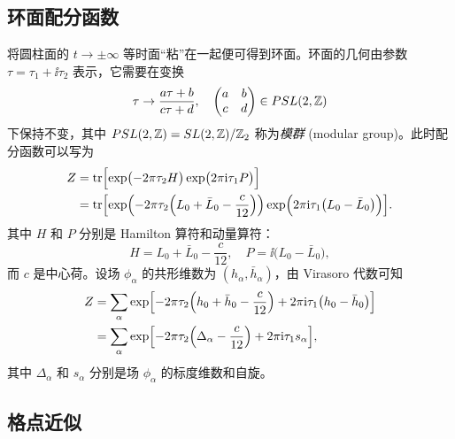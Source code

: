 \subsection{环面配分函数}

将圆柱面的 $t\to\pm\infty$ 等时面“粘”在一起便可得到环面。环面的几何由参数 $\tau=\tau_1+\ii\tau_2$ 表示，它需要在变换
\begin{equation}
  \tau \to \frac{a\tau+b}{c\tau+d}, \quad \begin{pmatrix} a & b \\ c & d \end{pmatrix} \in PSL(2,\mathbb{Z})
\end{equation}
下保持不变，其中 $PSL(2,\mathbb{Z})=SL(2,\mathbb{Z})/\mathbb{Z}_2$ 称为\emph{模群} (modular group)。此时配分函数可以写为\cite{cardy1986operator,francesco2012conformal}
\begin{align}
  Z &= \operatorname{tr} \Bigl[ \exp \bigl( -2\pi\tau_2 H \bigr) \exp \bigl( 2\pi\mathrm{i}\tau_1 P \bigr) \Bigr] \notag \\
    &= \operatorname{tr} \Bigl[
         \exp \Bigl( -2\pi   \tau_2 \Bigl( L_0 + \bar{L}_0 - \frac{c}{12} \Bigr) \Bigr)
         \exp \Bigl(  2\pi\mathrm{i}\tau_1 \bigl( L_0 - \bar{L}_0 \bigr) \Bigr)
       \Bigr].
\end{align}
其中 $H$ 和 $P$ 分别是 Hamilton 算符和动量算符：
\begin{equation}
  H = L_0 + \bar{L}_0 - \frac{c}{12}, \quad P = \ii \bigl( L_0 - \bar{L}_0 \bigr),
\end{equation}
而 $c$ 是中心荷。设场 $\phi_\alpha$ 的共形维数为 $(h_\alpha,\bar{h}_\alpha)$，由 Virasoro 代数可知
\begin{align}
  Z &= \sum_\alpha \exp \Bigl[
         - 2\pi   \tau_2 \Bigl( h_0 + \bar{h}_0 - \frac{c}{12} \Bigr)
         + 2\pi\mathrm{i}\tau_1 \bigl( h_0 - \bar{h}_0 \bigr)
       \Bigr] \notag \\
    &= \sum_\alpha \exp \Bigl[
         - 2\pi   \tau_2 \Bigl(\Delta_\alpha - \frac{c}{12} \Bigr)
         + 2\pi\mathrm{i}\tau_1 s_\alpha
       \Bigr],
  \label{eq:torus-partition-function}
\end{align}
其中 $\Delta_\alpha$ 和 $s_\alpha$ 分别是场 $\phi_\alpha$ 的标度维数和自旋。

\subsection{格点近似}
\label{subsec:lattice-approximation}


